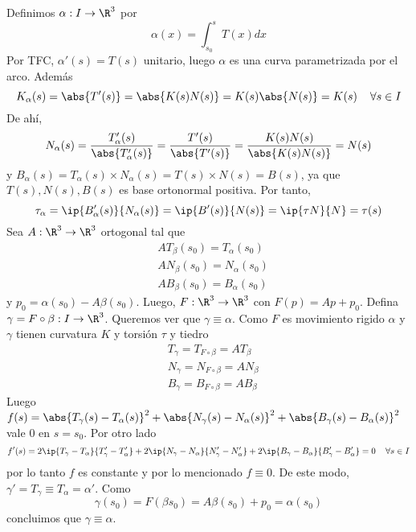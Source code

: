 \documentclass{article}
\begin{document}
\begin{dem}
    \noindent Definimos $\alpha:I\to\R^{3}$ por
    \begin{equation*}
        \alpha(x)=\int_{s_{0}}^{s}T(x)dx
    \end{equation*}
    Por TFC, $\alpha'(s)=T(s)$ unitario, luego $\alpha$ es una curva parametrizada por el arco.
    Además
    \begin{equation*}
        K_{\alpha}(s)=\abs{T'(s)}=\abs{K(s)N(s)}=K(s)\abs{N(s)}=K(s)\hspace{4mm}\forall s\in I
    \end{equation*}
    De ahí,
    \begin{equation*}
        N_{\alpha}(s)=\frac{T'_{\alpha}(s)}{\abs{T'_{\alpha}(s)}}=\frac{T'(s)}{\abs{T'(s)}}=
        \frac{K(s)N(s)}{\abs{K(s)N(s)}}=N(s)
    \end{equation*}
    y $B_{\alpha}(s)=T_{\alpha}(s)\times N_{\alpha}(s)=T(s)\times N(s)=B(s)$, ya que 
    $T(s),N(s),B(s)$ es base ortonormal positiva. Por tanto,
    \begin{equation*}
        \tau_{\alpha}=\ip{B'_{\alpha}(s)}{N_{\alpha}(s)}=\ip{B'(s)}{N(s)}=\ip{\tau N}{N}=\tau(s)
    \end{equation*}
    Sea $A:\R^{3}\to\R^{3}$ ortogonal tal que
    \begin{align*}
        & AT_{\beta}(s_{0})=T_{\alpha}(s_{0}) \\
        & AN_{\beta}(s_{0})=N_{\alpha}(s_{0}) \\
        & AB_{\beta}(s_{0})=B_{\alpha}(s_{0})
    \end{align*}
    y $p_{0}=\alpha(s_{0})-A\beta(s_{0})$. Luego, $F:\R^{3}\to\R^{3}$ con $F(p)=Ap+p_{0}$. Defina
    $\gamma=F\circ\beta:I\to\R^{3}$. Queremos ver que $\gamma\equiv\alpha$. Como $F$ es movimiento
    rigido $\alpha$ y $\gamma$ tienen curvatura $K$ y torsión $\tau$ y tiedro
    \begin{align*}
        & T_{\gamma}=T_{F\circ\beta}=AT_{\beta} \\
        & N_{\gamma}=N_{F\circ\beta}=AN_{\beta} \\
        & B_{\gamma}=B_{F\circ\beta}=AB_{\beta}
    \end{align*}
    Luego
    $f(s)=\abs{T_{\gamma}(s)-T_{\alpha}(s)}^{2}+
    \abs{N_{\gamma}(s)-N_{\alpha}(s)}^{2}+\abs{B_{\gamma}(s)-B_{\alpha}(s)}^{2}$
    vale $0$ en $s=s_{0}$. Por otro lado
    \begin{equation*}
        f'(s)=2\ip{T_{\gamma}-T_{\alpha}}{T'_{\gamma}-T'_{\alpha}}
        +2\ip{N_{\gamma}-N_{\alpha}}{N'_{\gamma}-N'_{\alpha}}
        +2\ip{B_{\gamma}-B_{\alpha}}{B'_{\gamma}-B'_{\alpha}}=0\hspace{4mm}\forall s\in I
    \end{equation*}
    por lo tanto $f$ es constante y por lo mencionado $f\equiv0$. De este modo, 
    $\gamma'=T_{\gamma}\equiv T_{\alpha}=\alpha'$. Como 
    \begin{equation*}
        \gamma(s_{0})=F(\beta{s_{0}})=A\beta(s_{0})+p_{0}=\alpha(s_{0})
    \end{equation*}
    concluimos que $\gamma\equiv\alpha$.
\end{dem}
\end{document}
